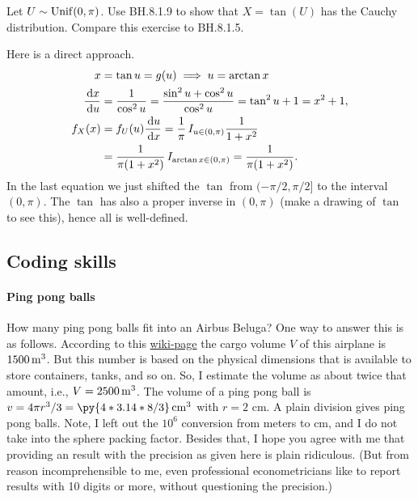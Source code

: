\documentclass[assignments]{subfiles}
\begin{document}
\begin{exercise}
Let $U \sim  \mathrm{Unif}(0, \pi)$.
Use  BH.8.1.9 to show that $X = \tan(U)$ has the Cauchy distribution. Compare this exercise to BH.8.1.5.
\begin{solution}
Here is a direct approach.
  \begin{align}
    \label{eq:20}
x&=\tan u = g(u) \implies u = \arctan x\\
\frac{\,\textrm{d}x}{\,\textrm{d}u } &= \frac{1}{\cos^{2} u} = \frac{\sin^{2}u + \cos^{2}u }{\cos^{2}u} = \tan^{2} u + 1 = x^{2} + 1,\\
f_{X}(x) &= f_{U}(u) \frac{\,\textrm{d}u}{\,\textrm{d}x} = \frac{1}{\pi}\,I_{u\in (0, \pi)} \frac{1}{1+x^{2}} \\
&=\frac{1}{\pi(1+x^{2})}\,I_{\arctan x \in (0, \pi)} =\frac{1}{\pi(1+x^{2})}.
  \end{align}
  In the last equation we just shifted the $\tan$ from $(-\pi/2, \pi/2]$ to the interval $(0, \pi)$.
  The $\tan$ has also a proper inverse in $(0,\pi)$ (make a drawing of $\tan$ to see this), hence all is well-defined.
\end{solution}
\end{exercise}



\subsection{Coding skills}

\paragraph{Ping pong balls}



How many ping pong balls fit into an Airbus Beluga?
One way to answer this is as follows.
According to this \href{https://en.wikipedia.org/wiki/Airbus\_Beluga}{wiki-page} the cargo volume $V$ of this airplane is $1500 \,\mathrm{m}^{3}$.
But this number is based on the physical dimensions that is available to store containers, tanks, and so on.
So, I estimate the volume as about twice that amount, i.e., $V = 2500 \,\mathrm{m}^{3}$.
The volume of a ping pong ball is $v = 4 \pi r^3/3  = \py{4*3.14*8/3} \cm^{3}$ with $r=2$ cm.
A plain division gives  ping pong balls.
Note, I left out the $10^{6}$ conversion from meters to cm, and I do not take into the sphere packing factor.
Besides that, I hope you agree with me that providing an result with the precision as given here is plain ridiculous.
(But from reason incomprehensible to me, even professional econometricians like to report results with 10 digits or more, without questioning the precision.)
\end{document}
